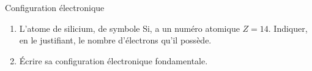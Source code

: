 \documentclass[12pt,a4paper]{article}
\begin{document}
\begin{exo}{Configuration électronique}

\begin{enumerate}
\item \anarai{}  \com{} 

L'atome de silicium, de symbole Si, a un numéro atomique $Z=14$.
Indiquer, en le justifiant, le nombre d'électrons qu'il possède.

\item \anarai{} 

Écrire sa configuration électronique fondamentale.
\end{enumerate}

\end{exo}

\vfill
\makecptces{}
\end{document}
